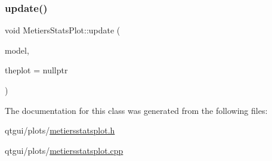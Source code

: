 \mbox{\label{class_metiers_stats_plot_a05dc9db5dc0dc3aff2eff1f724a42eb0}} 
\subsubsection{\texorpdfstring{update()}{update()}}
{\footnotesize\ttfamily void Metiers\+Stats\+Plot\+::update (\begin{DoxyParamCaption}\item[{\mbox{\hyperlink{class_displace_model}{Displace\+Model}} $\ast$}]{model,  }\item[{\mbox{\hyperlink{class_q_custom_plot}{Q\+Custom\+Plot}} $\ast$}]{theplot = {\ttfamily nullptr} }\end{DoxyParamCaption})}



The documentation for this class was generated from the following files\+:\begin{DoxyCompactItemize}
\item 
qtgui/plots/\mbox{\hyperlink{metiersstatsplot_8h}{metiersstatsplot.\+h}}\item 
qtgui/plots/\mbox{\hyperlink{metiersstatsplot_8cpp}{metiersstatsplot.\+cpp}}\end{DoxyCompactItemize}

